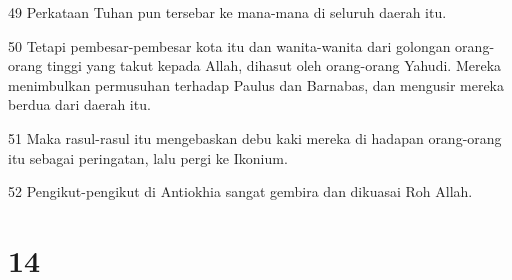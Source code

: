\par 49 Perkataan Tuhan pun tersebar ke mana-mana di seluruh daerah itu.
\par 50 Tetapi pembesar-pembesar kota itu dan wanita-wanita dari golongan orang-orang tinggi yang takut kepada Allah, dihasut oleh orang-orang Yahudi. Mereka menimbulkan permusuhan terhadap Paulus dan Barnabas, dan mengusir mereka berdua dari daerah itu.
\par 51 Maka rasul-rasul itu mengebaskan debu kaki mereka di hadapan orang-orang itu sebagai peringatan, lalu pergi ke Ikonium.
\par 52 Pengikut-pengikut di Antiokhia sangat gembira dan dikuasai Roh Allah.

\chapter{14}

